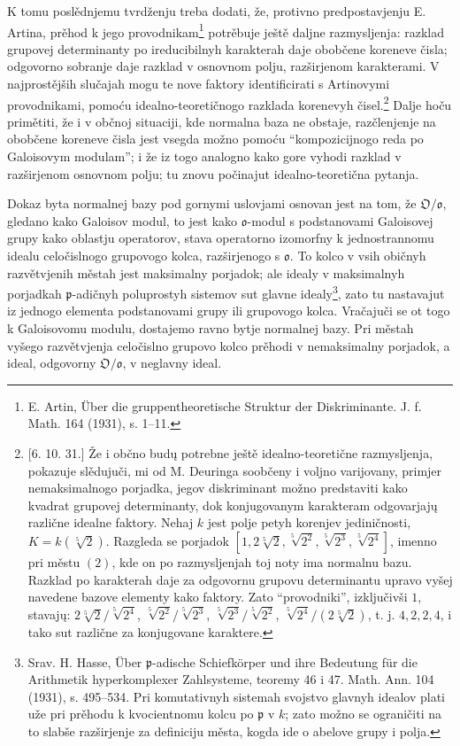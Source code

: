 \documentclass[11pt]{article}
\providecommand{\frakO}{\mathfrak{O}}
\providecommand{\frako}{\mathfrak{o}}
\providecommand{\frakp}{\mathfrak{p}}
\begin{document}
K tomu poslědnjemu tvrdženju treba dodati, že, protivno predpostavjenju E. Artina, prěhod k jego provodnikam\footnote{E. Artin, Über die gruppentheoretische Struktur der Diskriminante. J. f. Math. 164 (1931), s. 1--11.} potrěbuje ještě daljne razmysljenja: razklad grupovej determinanty po ireducibilnyh karakterah daje obobčene koreneve čisla; odgovorno sobranje daje razklad v osnovnom polju, razširjenom karakterami. V najprostějših slučajah mogu te nove faktory identificirati s Artinovymi provodnikami, pomoću idealno-teoretičnogo razklada korenevyh čisel.\footnote{[6. 10. 31.] Že i občno budų potrebne ještě idealno-teoretične razmysljenja, pokazuje slědujuči, mi od M. Deuringa soobčeny i voljno varijovany, primjer nemaksimalnogo porjadka, jegov diskriminant možno predstaviti kako kvadrat grupovej determinanty, dok konjugovanym karakteram odgovarjajų različne idealne faktory. Nehaj \(k\) jest polje petyh korenjev jediničnosti, \(K=k(\sqrt[5]{2})\). Razgleda se porjadok \([1,2\sqrt[5]{2},\sqrt[5]{2^2},\sqrt[5]{2^3},\sqrt[5]{2^4}]\), imenno pri městu \((2)\), kde on po razmysljenjah toj noty ima normalnu bazu. Razklad po karakterah daje za odgovornu grupovu determinantu upravo vyšej navedene bazove elementy kako faktory. Zato ``provodniki'', izključivši \(1\), stavajų: \(2\sqrt[5]{2}/\sqrt[5]{2^4}\), \(\sqrt[5]{2^2}/\sqrt[5]{2^3}\), \(\sqrt[5]{2^3}/\sqrt[5]{2^2}\), \(\sqrt[5]{2^4}/(2\sqrt[5]{2})\), t. j. \(4,2,2,4\), i tako sut različne za konjugovane karaktere.} Dalje hoču primětiti, že i v občnoj situaciji, kde normalna baza ne obstaje, razčlenjenje na obobčene koreneve čisla jest vsegda možno pomoću ``kompozicijnogo reda po Galoisovym modulam''; i že iz togo analogno kako gore vyhodi razklad v razširjenom osnovnom polju; tu znovu počinajut idealno-teoretična pytanja.

Dokaz byta normalnej bazy pod gornymi uslovjami osnovan jest na tom, že \(\frakO/\frako\), gledano kako Galoisov modul, to jest kako \(\frako\)-modul s podstanovami Galoisovej grupy kako oblastju operatorov, stava operatorno izomorfny k jednostrannomu idealu celočislnogo grupovogo kolca, razširjenogo s \(\frako\). To kolco v vsih običnyh razvětvjenih městah jest maksimalny porjadok; ale idealy v maksimalnyh porjadkah \(\frakp\)-adičnyh poluprostyh sistemov sut glavne idealy\footnote{Srav. H. Hasse, Über \(\frakp\)-adische Schiefkörper und ihre Bedeutung für die Arithmetik hyperkomplexer Zahlsysteme, teoremy 46 i 47. Math. Ann. 104 (1931), s. 495--534. Pri komutativnyh sistemah svojstvo glavnyh idealov plati uže pri prěhodu k kvocientnomu kolcu po \(\frakp\) v \(k\); zato možno se ograničiti na to slabše razširjenje za definiciju města, kogda ide o abelove grupy i polja.}, zato tu nastavajut iz jednogo elementa podstanovami grupy ili grupovogo kolca. Vračajuči se ot togo k Galoisovomu modulu, dostajemo ravno bytje normalnej bazy. Pri městah vyšego razvětvjenja celočislno grupovo kolco prěhodi v nemaksimalny porjadok, a ideal, odgovorny \(\frakO/\frako\), v neglavny ideal.
\end{document}
